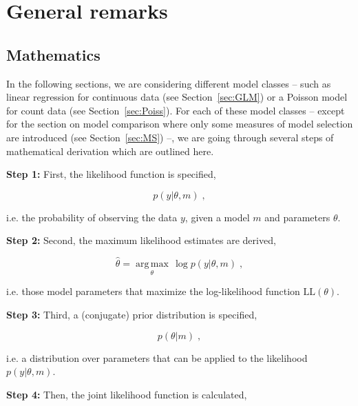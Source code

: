 

\setcounter{section}{-1}
\setcounter{equation}{0}
\section{General remarks} \label{sec:GR}

\subsection{Mathematics} \label{sec:GR-Math}

In the following sections, we are considering different model classes -- such as linear regression for continuous data (see Section~\ref{sec:GLM}) or a Poisson model for count data (see Section~\ref{sec:Poiss}). For each of these model classes -- except for the section on model comparison where only some measures of model selection are introduced (see Section~\ref{sec:MS}) --, we are going through several steps of mathematical derivation which are outlined here.

\textbf{Step 1:} First, the likelihood function is specified,

\begin{equation} \label{GR-LF}
p(y|\theta,m) \; ,
\end{equation}

i.e. the probability of observing the data $y$, given a model $m$ and parameters $\theta$.

\textbf{Step 2:} Second, the maximum likelihood estimates are derived,

\begin{equation} \label{GR-MLE}
\hat{\theta} = \operatorname*{arg\,max}_\theta \, \log p(y|\theta,m) \; ,
\end{equation}

i.e. those model parameters that maximize the log-likelihood function $\mathrm{LL}(\theta)$.

\textbf{Step 3:} Third, a (conjugate) prior distribution is specified,

\begin{equation} \label{GR-prior}
p(\theta|m) \; ,
\end{equation}

i.e. a distribution over parameters that can be applied to the likelihood $p(y|\theta,m)$.

\textbf{Step 4:} Then, the joint likelihood function is calculated,

